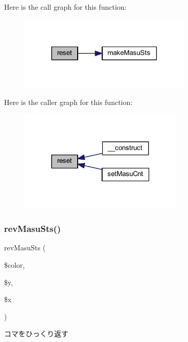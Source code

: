 Here is the call graph for this function\+:
\nopagebreak
\begin{figure}[H]
\begin{center}
\leavevmode
\includegraphics[width=234pt]{class_reversi_a4a20559544fdf4dcb457e258dc976cf8_cgraph}
\end{center}
\end{figure}
Here is the caller graph for this function\+:
\nopagebreak
\begin{figure}[H]
\begin{center}
\leavevmode
\includegraphics[width=223pt]{class_reversi_a4a20559544fdf4dcb457e258dc976cf8_icgraph}
\end{center}
\end{figure}
\mbox{\label{class_reversi_af29cd3f41dc1cffead056dbbed55ae7a}} 
\subsubsection{\texorpdfstring{rev\+Masu\+Sts()}{revMasuSts()}}
{\footnotesize\ttfamily rev\+Masu\+Sts (\begin{DoxyParamCaption}\item[{}]{\$color,  }\item[{}]{\$y,  }\item[{}]{\$x }\end{DoxyParamCaption})\hspace{0.3cm}{\ttfamily [private]}}



コマをひっくり返す 


